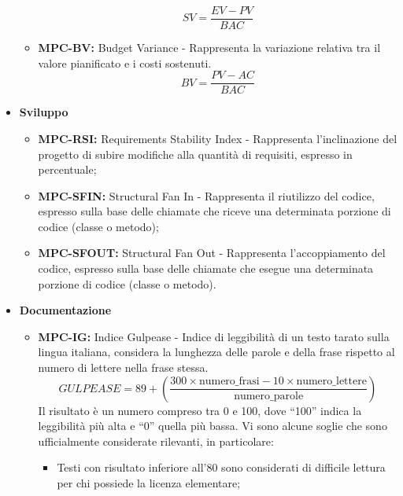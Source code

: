 \documentclass[8pt]{article}
\begin{document}
\begin{itemize}
\begin{itemize}
                \begin{equation}
                SV = \frac{EV - PV}{BAC}
                \end{equation}
            \item \textbf{MPC-BV:} Budget Variance - Rappresenta la variazione relativa tra il valore pianificato e i costi sostenuti.
                \begin{equation}
                BV = \frac{PV - AC}{BAC}
                \end{equation}
        \end{itemize}        
       \clearpage
    \item \textbf{Sviluppo}
        \begin{itemize}
            \item \textbf{MPC-RSI:} Requirements Stability Index - Rappresenta l'inclinazione del progetto di subire modifiche alla quantità di requisiti, espresso in percentuale;
            \item \textbf{MPC-SFIN:} Structural Fan In - Rappresenta il riutilizzo del codice, espresso sulla base delle chiamate che riceve una determinata porzione di codice (classe o metodo);
            \item \textbf{MPC-SFOUT:} Structural Fan Out - Rappresenta l'accoppiamento del codice, espresso sulla base delle chiamate che esegue una determinata porzione di codice (classe o metodo).
        \end{itemize}
   \item \textbf{Documentazione}
        \begin{itemize}
            \item \textbf{MPC-IG:} Indice Gulpease - Indice di leggibilità di un testo tarato sulla
                lingua italiana, considera la lunghezza delle parole e della frase rispetto al
                numero di lettere nella frase stessa.
                \begin{equation}
                GULPEASE = 89 + \left(\frac{{300 \times \text{numero\_frasi} - 10 \times \text{numero\_lettere}}}{{\text{numero\_parole}}}\right)
                \end{equation}
                Il risultato è un numero compreso tra 0 e 100, dove ``100'' indica la leggibilità più alta e ``0'' quella più bassa. Vi sono alcune soglie che sono ufficialmente considerate rilevanti, in particolare:
                \begin{itemize}
                    \item Testi con risultato inferiore all'80 sono considerati di difficile lettura per chi possiede la licenza elementare;

\end{itemize}
\end{itemize}
\end{itemize}
\end{document}
